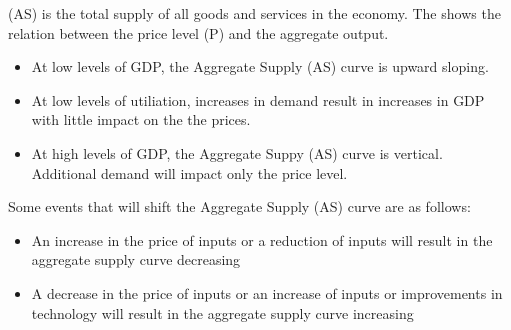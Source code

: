 \documentclass{article}
\begin{document}
 (AS) is the total supply of all goods and services in the economy. The  shows the relation between the price level (P) and the aggregate output. 
\begin{itemize}
  \item At low levels of GDP, the Aggregate Supply (AS) curve is upward sloping. 
  \item At low levels of utiliation, increases in demand result in increases in GDP with little impact on the the prices. 
  \item At high levels of GDP, the Aggregate Suppy (AS) curve is vertical. Additional demand will impact only the price level.
\end{itemize}
Some events that will shift the Aggregate Supply (AS) curve are as follows: 
\begin{itemize}
  \item An increase in the price of inputs or a reduction of inputs will result in the aggregate supply curve decreasing 
  \item A decrease in the price of inputs or an increase of inputs or improvements in technology will result in the aggregate supply curve increasing
\end{itemize}
\end{document}
